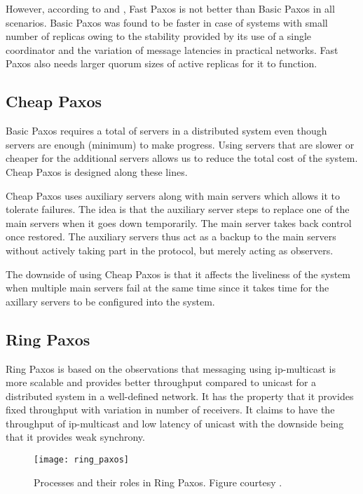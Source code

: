 However, according to \citet{Vieira08theperformance} and \citet{Junqueira2007},
Fast Paxos is not better than Basic Paxos in all scenarios. Basic Paxos was
found to be faster in case of systems with small number of replicas owing to
the stability provided by its use of a single coordinator and the variation
of message latencies in practical networks. Fast Paxos also needs larger quorum
sizes of active replicas for it to function.

\subsection{Cheap Paxos}

Basic Paxos requires a total of  servers in a distributed system
even though  servers are enough (minimum) to make progress.
Using servers that are slower or cheaper for the additional  servers
allows us to reduce the total cost of the system. Cheap Paxos is designed along
these lines.

Cheap Paxos uses  auxiliary servers along with  main servers
which allows it to tolerate  failures. The idea is that the auxiliary
server steps to replace one of the main servers when it goes down
temporarily. The main server takes back control once restored. The auxiliary
servers thus act as a backup to the main servers without actively taking part
in the protocol, but merely acting as observers.

The downside of using Cheap Paxos is that it affects the liveliness of the
system when multiple main servers fail at the same time since it takes time
for the axillary servers to be configured into the system.

\subsection{Ring Paxos}

Ring Paxos \citep{MarandiPSP10} is based on the observations that messaging
using ip-multicast is more scalable and provides better throughput compared
to unicast for a distributed system in a well-defined network. It
has the property that it provides fixed throughput with variation in number
of receivers. It claims to have the throughput of ip-multicast and low latency
of unicast with the downside being that it provides weak synchrony.

\begin{figure}
  \texttt{[image: ring\_paxos]}
  \caption[Ring Paxos]{%
  Processes and their roles in Ring Paxos. Figure courtesy
  \citep{MarandiPSP10}.}
  \label{figure:ring.paxos}
\end{figure}

